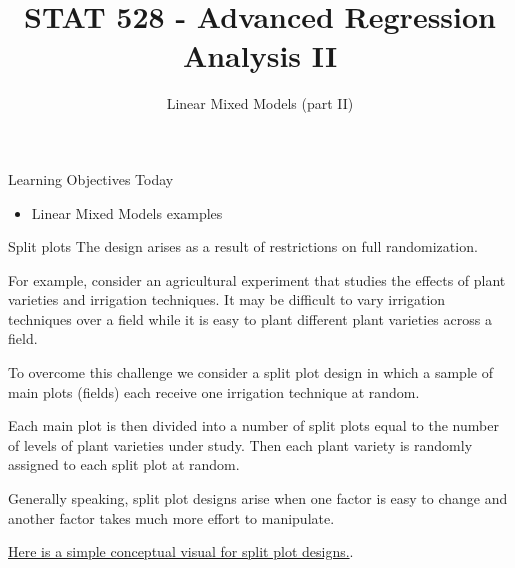 \documentclass[
  ignorenonframetext,
]{beamer}
\title{STAT 528 - Advanced Regression Analysis II}
\author{Linear Mixed Models (part II)}
\date{}
\institute{Daniel J. Eck\\
Department of Statistics\\
University of Illinois}
\providecommand{\tightlist}{%
  \setlength{\itemsep}{0pt}\setlength{\parskip}{0pt}}
\begin{document}
\frame{\titlepage}

\begin{frame}
\newcommand{\R}{\mathbb{R}}
\end{frame}

\begin{frame}{Learning Objectives Today}
\protect\hypertarget{learning-objectives-today}{}
\begin{itemize}
\tightlist
\item
  Linear Mixed Models examples
\end{itemize}
\end{frame}

\begin{frame}{Split plots}
\protect\hypertarget{split-plots}{}
The design arises as a result of restrictions on full randomization.

For example, consider an agricultural experiment that studies the
effects of plant varieties and irrigation techniques. It may be
difficult to vary irrigation techniques over a field while it is easy to
plant different plant varieties across a field.

To overcome this challenge we consider a split plot design in which a
sample of main plots (fields) each receive one irrigation technique at
random.

Each main plot is then divided into a number of split plots equal to the
number of levels of plant varieties under study. Then each plant variety
is randomly assigned to each split plot at random.

Generally speaking, split plot designs arise when one factor is easy to
change and another factor takes much more effort to manipulate.

\href{https://www.statology.org/split-plot-design/}{Here is a simple
conceptual visual for split plot designs.}.
\end{frame}
\end{document}
